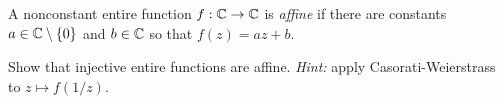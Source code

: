 \documentclass{homework}
\begin{document}
                                                                                                                      \begin{problem}\label{entire-injective-is-affine}A nonconstant entire function
                                                                                                                        $f : \mathbb{C} \to \mathbb{C}$ is \textit{affine} if there are constants
                                                                                                                          $a \in \mathbb{C} \setminus \{0\}$ and $b \in \mathbb{C}$ so that $f(z) = az + b$.
                                                                                                                            
                                                                                                                              Show that injective entire functions are affine.  \textit{Hint:}
                                                                                                                                apply Casorati-Weierstrass to $z \mapsto f(1/z)$.
                                                                                                                                \end{problem}
\end{document}
